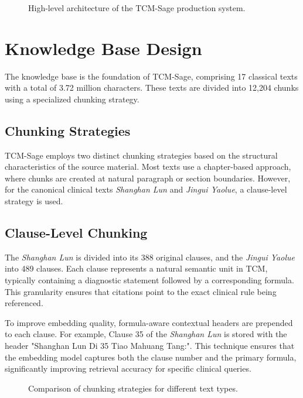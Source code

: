 \begin{figure}[H]
    \centering
    \caption{High-level architecture of the TCM-Sage production system.}
    \label{fig:system_arch}
\end{figure}

\section{Knowledge Base Design}

The knowledge base is the foundation of TCM-Sage, comprising 17 classical texts with a total of 3.72 million characters. These texts are divided into 12,204 chunks using a specialized chunking strategy.

\subsection{Chunking Strategies}

TCM-Sage employs two distinct chunking strategies based on the structural characteristics of the source material. Most texts use a chapter-based approach, where chunks are created at natural paragraph or section boundaries. However, for the canonical clinical texts \textit{Shanghan Lun} and \textit{Jingui Yaolue}, a clause-level strategy is used.

\subsection{Clause-Level Chunking}

The \textit{Shanghan Lun} is divided into its 388 original clauses, and the \textit{Jingui Yaolue} into 489 clauses. Each clause represents a natural semantic unit in TCM, typically containing a diagnostic statement followed by a corresponding formula. This granularity ensures that citations point to the exact clinical rule being referenced.

To improve embedding quality, formula-aware contextual headers are prepended to each clause. For example, Clause 35 of the \textit{Shanghan Lun} is stored with the header "Shanghan Lun Di 35 Tiao Mahuang Tang:". This technique ensures that the embedding model captures both the clause number and the primary formula, significantly improving retrieval accuracy for specific clinical queries.

\begin{figure}[H]
    \centering
    \caption{Comparison of chunking strategies for different text types.}
    \label{fig:chunking_strategy}
\end{figure}

